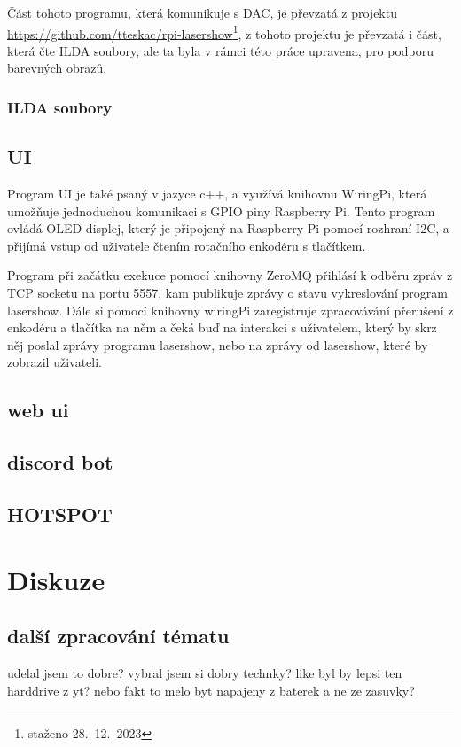 \documentclass{template/socthesis}
\begin{document}
Část tohoto programu, která komunikuje s DAC, je převzatá z projektu \url{https://github.com/tteskac/rpi-lasershow}\footnote{staženo 28.~12.~2023}, z tohoto projektu je převzatá i část, která čte ILDA soubory, ale ta byla v rámci této práce upravena, pro podporu barevných obrazů.

\subsection{ILDA soubory}

\section{UI}

Program UI je také psaný v jazyce c++, a využívá knihovnu WiringPi, která umožňuje jednoduchou komunikaci s GPIO piny Raspberry Pi. Tento program ovládá OLED displej, který je připojený na Raspberry Pi pomocí rozhraní I2C, a přijímá vstup od uživatele čtením rotačního enkodéru s tlačítkem.

Program při začátku exekuce pomocí knihovny ZeroMQ přihlásí k odběru zpráv z TCP socketu na portu 5557, kam publikuje zprávy o stavu vykreslování program lasershow. Dále si pomocí knihovny wiringPi zaregistruje zpracovávání přerušení z enkodéru a tlačítka na něm a čeká buď na interakci s uživatelem, který by skrz něj poslal zprávy programu lasershow, nebo na zprávy od lasershow, které by zobrazil uživateli.

\section{web ui}



\section{discord bot}
\section{HOTSPOT}

\chapter{Diskuze}
\section{další zpracování tématu}
udelal jsem to dobre? vybral jsem si dobry technky?
like byl by lepsi ten harddrive z yt?
nebo fakt to melo byt napajeny z baterek a ne ze zasuvky?
\end{document}
